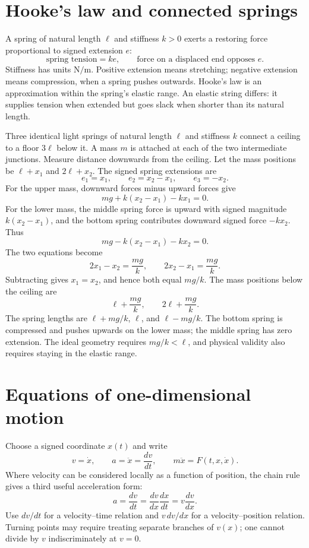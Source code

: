 \section{Hooke's law and connected springs}
A spring of natural length $\ell$ and stiffness $k>0$ exerts a restoring
force proportional to signed extension $e$:
\[
\text{spring tension}=ke,\qquad\text{force on a displaced end opposes }e.
\]
Stiffness has units $\mathrm{N/m}$. Positive extension means stretching;
negative extension means compression, when a spring pushes outwards.
Hooke's law is an approximation within the spring's elastic range.
An elastic string differs: it supplies tension when extended but goes
slack when shorter than its natural length.

\begin{example}
Three identical light springs of natural length $\ell$ and stiffness $k$
connect a ceiling to a floor $3\ell$ below it. A mass $m$ is attached at
each of the two intermediate junctions.
Measure distance downwards from the ceiling. Let the mass positions be
$\ell+x_1$ and $2\ell+x_2$. The signed spring extensions are
\[
e_1=x_1,\qquad e_2=x_2-x_1,\qquad e_3=-x_2.
\]
For the upper mass, downward forces minus upward forces give
\[
mg+k(x_2-x_1)-kx_1=0.
\]
For the lower mass, the middle spring force is upward with signed magnitude
$k(x_2-x_1)$, and the bottom spring contributes downward signed force
$-kx_2$. Thus
\[
mg-k(x_2-x_1)-kx_2=0.
\]
The two equations become
\[
2x_1-x_2=\frac{mg}{k},\qquad2x_2-x_1=\frac{mg}{k}.
\]
Subtracting gives $x_1=x_2$, and hence both equal $mg/k$.
The mass positions below the ceiling are
\[
\ell+\frac{mg}{k},\qquad2\ell+\frac{mg}{k}.
\]
The spring lengths are $\ell+mg/k$, $\ell$, and $\ell-mg/k$.
The bottom spring is compressed and pushes upwards on the lower mass;
the middle spring has zero extension. The ideal geometry requires
$mg/k<\ell$, and physical validity also requires staying in the elastic range.
\end{example}

\section{Equations of one-dimensional motion}
Choose a signed coordinate $x(t)$ and write
\[
v=\dot x,\qquad a=\ddot x=\frac{dv}{dt},\qquad
m\ddot x=F(t,x,\dot x).
\]
Where velocity can be considered locally as a function of position, the
chain rule gives a third useful acceleration form:
\[
a=\frac{dv}{dt}=\frac{dv}{dx}\frac{dx}{dt}=v\frac{dv}{dx}.
\]
Use $dv/dt$ for a velocity--time relation and $v\,dv/dx$ for a
velocity--position relation. Turning points may require treating separate
branches of $v(x)$; one cannot divide by $v$ indiscriminately at $v=0$.

